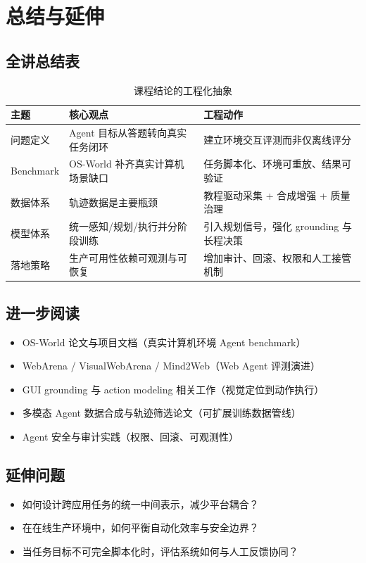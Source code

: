 \section{总结与延伸}

\subsection{全讲总结表}
\begin{table}[H]
\centering
\begin{tabular}{p{3.0cm}p{4.6cm}p{4.0cm}}
\toprule
\textbf{主题} & \textbf{核心观点} & \textbf{工程动作} \\
\midrule
问题定义 & Agent 目标从答题转向真实任务闭环 & 建立环境交互评测而非仅离线评分 \\
Benchmark & OS-World 补齐真实计算机场景缺口 & 任务脚本化、环境可重放、结果可验证 \\
数据体系 & 轨迹数据是主要瓶颈 & 教程驱动采集 + 合成增强 + 质量治理 \\
模型体系 & 统一感知/规划/执行并分阶段训练 & 引入规划信号，强化 grounding 与长程决策 \\
落地策略 & 生产可用性依赖可观测与可恢复 & 增加审计、回滚、权限和人工接管机制 \\
\bottomrule
\end{tabular}
\caption{课程结论的工程化抽象}
\end{table}

\subsection{进一步阅读}
\begin{itemize}
    \item OS-World 论文与项目文档（真实计算机环境 Agent benchmark）
    \item WebArena / VisualWebArena / Mind2Web（Web Agent 评测演进）
    \item GUI grounding 与 action modeling 相关工作（视觉定位到动作执行）
    \item 多模态 Agent 数据合成与轨迹筛选论文（可扩展训练数据管线）
    \item Agent 安全与审计实践（权限、回滚、可观测性）
\end{itemize}

\subsection{延伸问题}
\begin{itemize}
    \item 如何设计跨应用任务的统一中间表示，减少平台耦合？
    \item 在在线生产环境中，如何平衡自动化效率与安全边界？
    \item 当任务目标不可完全脚本化时，评估系统如何与人工反馈协同？
\end{itemize}


